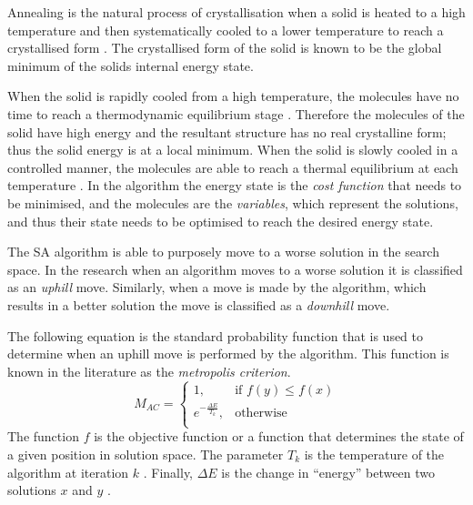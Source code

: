 Annealing is the natural process of crystallisation when a solid is heated to a high temperature and then systematically cooled to a lower temperature to reach a crystallised form \cite{NewSAs,ConstantTempSA}. The crystallised form of the solid is known to be the global minimum of the solids internal energy state. 

When the solid is rapidly cooled from a high temperature, the molecules have no time to reach a thermodynamic equilibrium stage \cite{MobileRobotSA,ConstantTempSA}. Therefore the molecules of the solid have high energy and the resultant structure has no real crystalline form; thus the solid energy is at a local minimum\cite{CurveFittingSA,NewSAs,MobileRobotSA}. When the solid is slowly cooled in a controlled manner, the molecules are able to reach a thermal equilibrium at each temperature \cite{ChaosSA,CurveFittingSA,NewSAs}.
In the algorithm the energy state is the \emph{cost function} that needs to be minimised, and the molecules are the \emph{variables}, which represent the solutions, and thus their state needs to be optimised to reach the desired energy state.

The \gls{SA} algorithm is able to purposely move to a worse solution in the search space\cite{EcoEquilSA}. In the research when an algorithm moves to a worse solution it is classified as an \emph{uphill} move\cite{AIModernApproach}. Similarly, when a move is made by the algorithm, which results in a better solution the move is classified as a \emph{downhill} move\cite{AIModernApproach}.

The following equation is the standard probability function that is used to determine when an uphill move is performed by the algorithm. This function is known in the literature as the \emph{metropolis criterion}. 
\begin{equation}
\label{eq:saprobability}
	M_{AC} =
	\begin{cases}
	1, &\text{if $f(y) \leq f(x)$}\\
	e^{-\frac{\Delta E}{T_k}} , &\text{otherwise}\\
	\end{cases}
\end{equation}
The function $f$ is the objective function or a function that determines the state of a given position in solution space\cite{EcoEquilSA}. The parameter $T_k$ is the temperature of the algorithm at iteration $k$ \cite{EcoEquilSA}. Finally, $\Delta E$ is the change in ``energy'' between two solutions $x$ and $y$ \cite{EcoEquilSA}.

